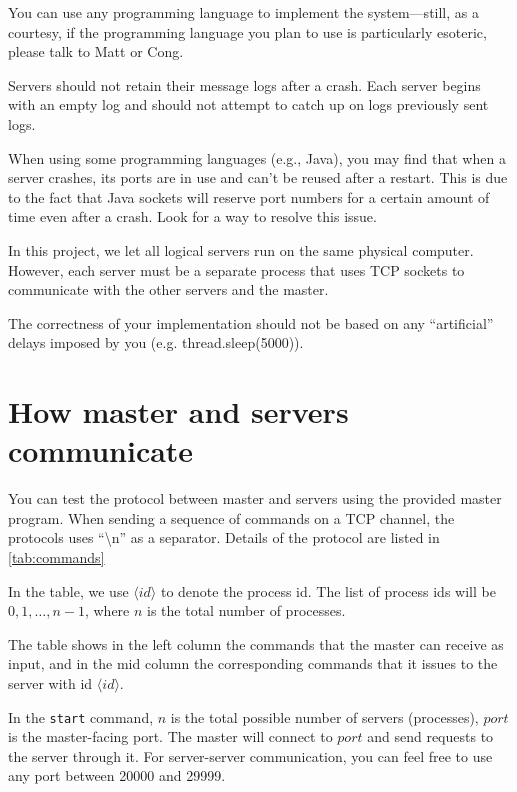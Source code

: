 \documentclass[11pt]{article}
\begin{document}
	\begin{compactitem}
		\item You can use any programming language to implement the system---still, as a courtesy, if the programming language you plan to use is particularly esoteric, please talk to Matt or Cong.
		\item Servers should not retain their message logs after a crash. Each server begins with an empty log and should not attempt to catch up on logs previously sent logs.
		\item When using some programming languages (e.g., Java), you may find that when a server crashes, its ports are in use and can't be reused after a restart. This is due to the fact that Java sockets will reserve port numbers for a certain amount of time even after a crash. Look for a way to resolve this issue.
		\item In this project, we let all logical servers run on the same physical 
		computer. However, each server must be a separate process that uses TCP sockets to communicate with the other servers and the master.
		\item The correctness of your implementation should not be based on any ``artificial'' delays imposed by you (e.g. thread.sleep(5000)).
	\end{compactitem}
	
	\section{How master and servers communicate}
	You can test the protocol between master and servers  using the provided master program. When sending a sequence of commands on a TCP channel, the protocols uses ``\textbackslash n'' as a separator. Details of the protocol are listed in \autoref{tab:commands}
	
	In the table, we use $\langle id\rangle$ to denote the process id. The list of process ids will be	$0,1,\dots,n-1$, where $n$ is the total number of processes. 
	
	The table shows in the left column the commands that the master can receive as  input, and in the mid column the corresponding commands that it issues to the server with id $\langle id\rangle$.
	
	In the \texttt{start} command, $n$ is the total possible number of servers
	(processes), $port$ is the master-facing port. The master will connect to $port$ and send requests to the server through it.	For server-server communication, you can feel free to use any port between 20000 and 29999.
		
\end{document}
